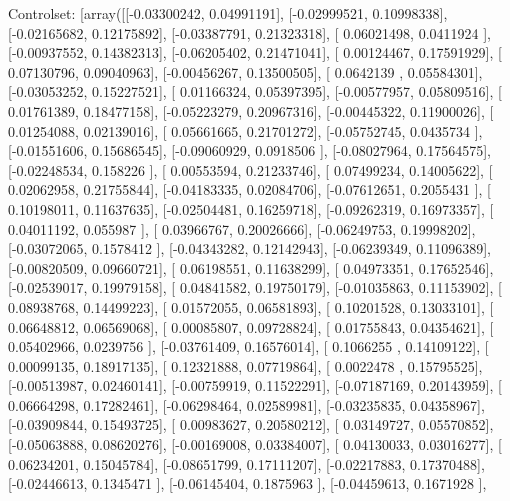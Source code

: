 \documentclass{article}
\begin{document}
Controlset: [array([[-0.03300242,  0.04991191],
       [-0.02999521,  0.10998338],
       [-0.02165682,  0.12175892],
       [-0.03387791,  0.21323318],
       [ 0.06021498,  0.0411924 ],
       [-0.00937552,  0.14382313],
       [-0.06205402,  0.21471041],
       [ 0.00124467,  0.17591929],
       [ 0.07130796,  0.09040963],
       [-0.00456267,  0.13500505],
       [ 0.0642139 ,  0.05584301],
       [-0.03053252,  0.15227521],
       [ 0.01166324,  0.05397395],
       [-0.00577957,  0.05809516],
       [ 0.01761389,  0.18477158],
       [-0.05223279,  0.20967316],
       [-0.00445322,  0.11900026],
       [ 0.01254088,  0.02139016],
       [ 0.05661665,  0.21701272],
       [-0.05752745,  0.0435734 ],
       [-0.01551606,  0.15686545],
       [-0.09060929,  0.0918506 ],
       [-0.08027964,  0.17564575],
       [-0.02248534,  0.158226  ],
       [ 0.00553594,  0.21233746],
       [ 0.07499234,  0.14005622],
       [ 0.02062958,  0.21755844],
       [-0.04183335,  0.02084706],
       [-0.07612651,  0.2055431 ],
       [ 0.10198011,  0.11637635],
       [-0.02504481,  0.16259718],
       [-0.09262319,  0.16973357],
       [ 0.04011192,  0.055987  ],
       [ 0.03966767,  0.20026666],
       [-0.06249753,  0.19998202],
       [-0.03072065,  0.1578412 ],
       [-0.04343282,  0.12142943],
       [-0.06239349,  0.11096389],
       [-0.00820509,  0.09660721],
       [ 0.06198551,  0.11638299],
       [ 0.04973351,  0.17652546],
       [-0.02539017,  0.19979158],
       [ 0.04841582,  0.19750179],
       [-0.01035863,  0.11153902],
       [ 0.08938768,  0.14499223],
       [ 0.01572055,  0.06581893],
       [ 0.10201528,  0.13033101],
       [ 0.06648812,  0.06569068],
       [ 0.00085807,  0.09728824],
       [ 0.01755843,  0.04354621],
       [ 0.05402966,  0.0239756 ],
       [-0.03761409,  0.16576014],
       [ 0.1066255 ,  0.14109122],
       [ 0.00099135,  0.18917135],
       [ 0.12321888,  0.07719864],
       [ 0.0022478 ,  0.15795525],
       [-0.00513987,  0.02460141],
       [-0.00759919,  0.11522291],
       [-0.07187169,  0.20143959],
       [ 0.06664298,  0.17282461],
       [-0.06298464,  0.02589981],
       [-0.03235835,  0.04358967],
       [-0.03909844,  0.15493725],
       [ 0.00983627,  0.20580212],
       [ 0.03149727,  0.05570852],
       [-0.05063888,  0.08620276],
       [-0.00169008,  0.03384007],
       [ 0.04130033,  0.03016277],
       [ 0.06234201,  0.15045784],
       [-0.08651799,  0.17111207],
       [-0.02217883,  0.17370488],
       [-0.02446613,  0.1345471 ],
       [-0.06145404,  0.1875963 ],
       [-0.04459613,  0.1671928 ],
\end{document}
